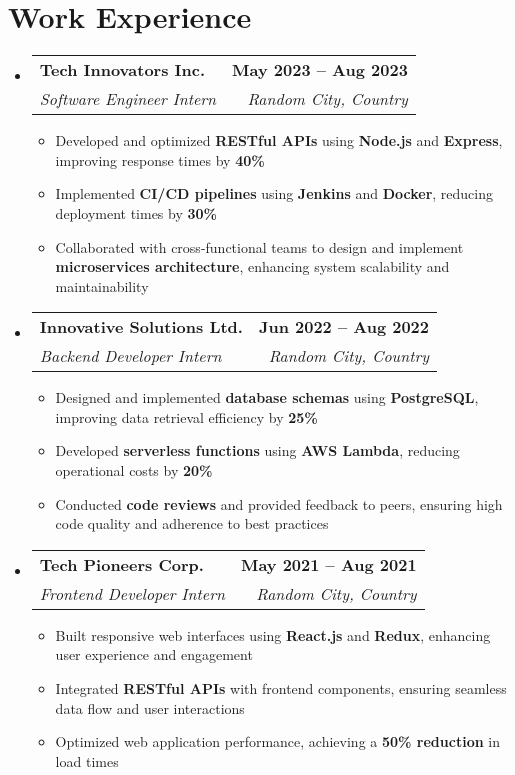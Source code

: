 \documentclass[letterpaper,11pt]{article}
\makeatletter
\newcommand{\resumeItem}[1]{
  \item\small{
    {#1 \vspace{0pt}}
  }
}
\newcommand{\resumeSubheading}[4]{
  \vspace{-2pt}\item
    \begin{tabular*}{1.0\textwidth}[t]{l@{\extracolsep{\fill}}r}
      \textbf{#1} & \textbf{\small #2} \\
      \textit{\small#3} & \textit{\small #4} \\
    \end{tabular*}\vspace{-7pt}
}
\newcommand{\resumeSubHeadingListStart}{\begin{itemize}[leftmargin=0.0in, label={}]}
\newcommand{\resumeSubHeadingListEnd}{\end{itemize}}\vspace{0pt}
\newcommand{\resumeItemListStart}{\begin{itemize}}
\newcommand{\resumeItemListEnd}{\end{itemize}\vspace{-5pt}}
\makeatother
\begin{document}
\section{Work Experience}
    \resumeSubHeadingListStart
                \resumeSubheading{Tech Innovators Inc.}{May 2023 -- Aug 2023}{Software Engineer Intern}{Random City, Country} 
                \resumeItemListStart
                    \resumeItem{Developed and optimized \textbf{RESTful APIs} using \textbf{Node.js} and \textbf{Express}, improving response times by \textbf{40\%}}
                    \resumeItem{Implemented \textbf{CI/CD pipelines} using \textbf{Jenkins} and \textbf{Docker}, reducing deployment times by \textbf{30\%}}
                    \resumeItem{Collaborated with cross-functional teams to design and implement \textbf{microservices architecture}, enhancing system scalability and maintainability}
                    \resumeItemListEnd
            \resumeSubheading{Innovative Solutions Ltd.}{Jun 2022 -- Aug 2022}{Backend Developer Intern}{Random City, Country} 
                \resumeItemListStart
                    \resumeItem{Designed and implemented \textbf{database schemas} using \textbf{PostgreSQL}, improving data retrieval efficiency by \textbf{25\%}}
                    \resumeItem{Developed \textbf{serverless functions} using \textbf{AWS Lambda}, reducing operational costs by \textbf{20\%}}
                    \resumeItem{Conducted \textbf{code reviews} and provided feedback to peers, ensuring high code quality and adherence to best practices}
                    \resumeItemListEnd
            \resumeSubheading{Tech Pioneers Corp.}{May 2021 -- Aug 2021}{Frontend Developer Intern}{Random City, Country}
                \resumeItemListStart
                    \resumeItem{Built responsive web interfaces using \textbf{React.js} and \textbf{Redux}, enhancing user experience and engagement}
                    \resumeItem{Integrated \textbf{RESTful APIs} with frontend components, ensuring seamless data flow and user interactions}
                    \resumeItem{Optimized web application performance, achieving a \textbf{50\% reduction} in load times}
                    \resumeItemListEnd
    \resumeSubHeadingListEnd
    \vspace{-12pt}

\end{document}
